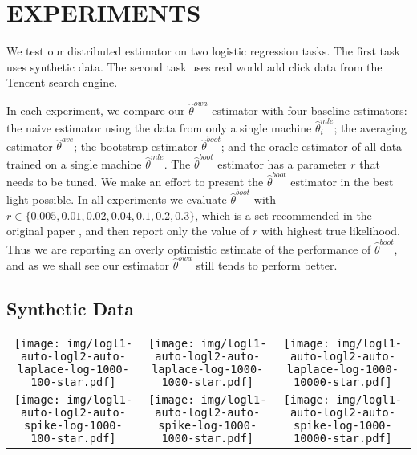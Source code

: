 \documentclass[twoside]{article}
\newcommand{\w}{\theta}
\newcommand{\wowa}{\hat\w^{owa}}
\newcommand{\wave}{\hat\w^{ave}}
\newcommand{\wboot}{\hat\w^{boot}}
\newcommand{\wmle}{\hat\w^{mle}}
\begin{document}
\section{EXPERIMENTS}
\label{sec:exp}

We test our distributed estimator on two logistic regression tasks.
The first task uses synthetic data.
The second task uses real world add click data from the Tencent search engine.

In each experiment, we compare our $\wowa$ estimator with four baseline estimators:
the naive estimator using the data from only a single machine $\wmle_i$;
the averaging estimator $\wave$;
the bootstrap estimator $\wboot$;
and the oracle estimator of all data trained on a single machine $\wmle$.
The $\wboot$ estimator has a parameter $r$ that needs to be tuned.
We make an effort to present the $\wboot$ estimator in the best light possible.
In all experiments we evaluate $\wboot$ with $r \in \{0.005,0.01,0.02,0.04,0.1,0.2,0.3\}$,
which is a set recommended in the original paper \citep{zhang2012communication},
and then report only the value of $r$ with highest true likelihood.
Thus we are reporting an overly optimistic estimate of the performance of $\wboot$,
and as we shall see our estimator $\wowa$ still tends to perform better.

\subsection{Synthetic Data}

\begin{figure*}[t]
\begin{tabular}{ccc}
  \texttt{[image: img/logl1-auto-logl2-auto-laplace-log-1000-100-star.pdf]}
& \texttt{[image: img/logl1-auto-logl2-auto-laplace-log-1000-1000-star.pdf]}
& \texttt{[image: img/logl1-auto-logl2-auto-laplace-log-1000-10000-star.pdf]}
\\
  \texttt{[image: img/logl1-auto-logl2-auto-spike-log-1000-100-star.pdf]}
& \texttt{[image: img/logl1-auto-logl2-auto-spike-log-1000-1000-star.pdf]}
& \texttt{[image: img/logl1-auto-logl2-auto-spike-log-1000-10000-star.pdf]}
\end{tabular}
\caption{}
\label{fig:synscale}
\end{figure*}
\end{document}

